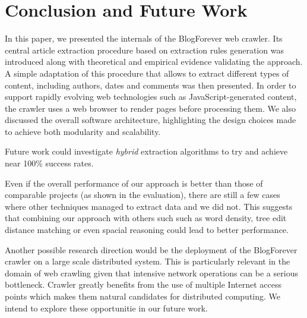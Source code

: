 \section{Conclusion and Future Work}
In this paper, we presented the internals of the BlogForever web crawler. Its central article extraction procedure based on extraction rules generation was introduced along with theoretical and empirical evidence validating the approach. A simple adaptation of this procedure that allows to extract different types of content, including authors, dates and comments was then presented. In order to support rapidly evolving web technologies such as JavaScript-generated content, the crawler uses a web browser to render pages before processing them. We also discussed the overall software architecture, highlighting the design choices made to achieve both modularity and scalability.

Future work could investigate \emph{hybrid} extraction algorithms to try and achieve near 100\% success rates. 


Even if the overall performance of our approach is better than those of comparable projects (as shown in the evaluation), there are still a few cases where other techniques managed to extract data and we did not. This suggests that combining our approach with others such such as word density, tree edit distance matching or even spacial reasoning could lead to better performance.

Another possible research direction would be the deployment of the BlogForever crawler on a large scale distributed system. This is particularly relevant in the domain of web crawling given that intensive network operations can be a serious bottleneck. Crawler greatly benefits from the use of multiple Internet access points which makes them natural candidates for distributed computing. We intend to explore these opportunitie in our future work.
